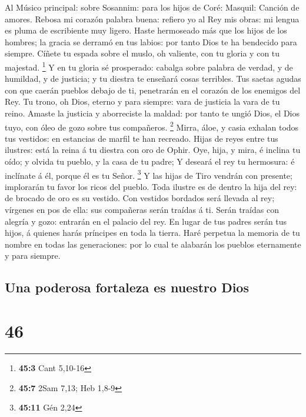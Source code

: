  Al Músico principal: sobre Sosannim: para los hijos de
Coré: Masquil: Canción de amores. Rebosa mi corazón palabra buena:
refiero yo al Rey mis obras: mi lengua es pluma de escribiente muy
ligero.  Haste hermoseado más que los hijos de los hombres;
la gracia se derramó en tus labios: por tanto Dios te ha bendecido para
siempre.  Cíñete tu espada sobre el muslo, oh valiente, con
tu gloria y con tu majestad. \footnote{\textbf{45:3} Cant 5,10-16}
 Y en tu gloria sé prosperado: cabalga sobre palabra de
verdad, y de humildad, y de justicia; y tu diestra te enseñará cosas
terribles.  Tus saetas agudas con que caerán pueblos debajo
de ti, penetrarán en el corazón de los enemigos del Rey.  Tu
trono, oh Dios, eterno y para siempre: vara de justicia la vara de tu
reino.  Amaste la justicia y aborreciste la maldad: por
tanto te ungió Dios, el Dios tuyo, con óleo de gozo sobre tus
compañeros. \footnote{\textbf{45:7} 2Sam 7,13; Heb 1,8-9} 
Mirra, áloe, y casia exhalan todos tus vestidos: en estancias de marfil
te han recreado.  Hijas de reyes entre tus ilustres: está la
reina á tu diestra con oro de Ophir.  Oye, hija, y mira, é
inclina tu oído; y olvida tu pueblo, y la casa de tu padre;
 Y deseará el rey tu hermosura: é inclínate á él, porque él
es tu Señor. \footnote{\textbf{45:11} Gén 2,24}  Y las
hijas de Tiro vendrán con presente; implorarán tu favor los ricos del
pueblo.  Toda ilustre es de dentro la hija del rey: de
brocado de oro es su vestido.  Con vestidos bordados será
llevada al rey; vírgenes en pos de ella: sus compañeras serán traídas á
ti.  Serán traídas con alegría y gozo: entrarán en el
palacio del rey.  En lugar de tus padres serán tus hijos, á
quienes harás príncipes en toda la tierra.  Haré perpetua
la memoria de tu nombre en todas las generaciones: por lo cual te
alabarán los pueblos eternamente y para siempre.

\hypertarget{una-poderosa-fortaleza-es-nuestro-dios}{%
\subsection{Una poderosa fortaleza es nuestro
Dios}\label{una-poderosa-fortaleza-es-nuestro-dios}}

\hypertarget{section-45}{%
\section{46}\label{section-45}}

